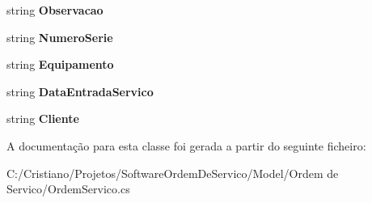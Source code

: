 \begin{DoxyCompactItemize}
\item 
\hypertarget{class_model_1_1_ordem__de___servico_1_1_ordem_servico_a3c3f7418d927ddc71abb008443979a3a}{}string {\bfseries Observacao}\label{class_model_1_1_ordem__de___servico_1_1_ordem_servico_a3c3f7418d927ddc71abb008443979a3a}

\item 
\hypertarget{class_model_1_1_ordem__de___servico_1_1_ordem_servico_a0969417157e2d0e2438858dd4568ab6c}{}string {\bfseries Numero\+Serie}\label{class_model_1_1_ordem__de___servico_1_1_ordem_servico_a0969417157e2d0e2438858dd4568ab6c}

\item 
\hypertarget{class_model_1_1_ordem__de___servico_1_1_ordem_servico_a671dafafad5d1da8afa821d0227f781c}{}string {\bfseries Equipamento}\label{class_model_1_1_ordem__de___servico_1_1_ordem_servico_a671dafafad5d1da8afa821d0227f781c}

\item 
\hypertarget{class_model_1_1_ordem__de___servico_1_1_ordem_servico_a5eeebe5356f0a238ad1c8955bbde8beb}{}string {\bfseries Data\+Entrada\+Servico}\label{class_model_1_1_ordem__de___servico_1_1_ordem_servico_a5eeebe5356f0a238ad1c8955bbde8beb}

\item 
\hypertarget{class_model_1_1_ordem__de___servico_1_1_ordem_servico_afbbda50a1d9541535e5e68ec231de5e9}{}string {\bfseries Cliente}\label{class_model_1_1_ordem__de___servico_1_1_ordem_servico_afbbda50a1d9541535e5e68ec231de5e9}

\end{DoxyCompactItemize}


A documentação para esta classe foi gerada a partir do seguinte ficheiro\+:\begin{DoxyCompactItemize}
\item 
C\+:/\+Cristiano/\+Projetos/\+Software\+Ordem\+De\+Servico/\+Model/\+Ordem de Servico/Ordem\+Servico.\+cs\end{DoxyCompactItemize}
